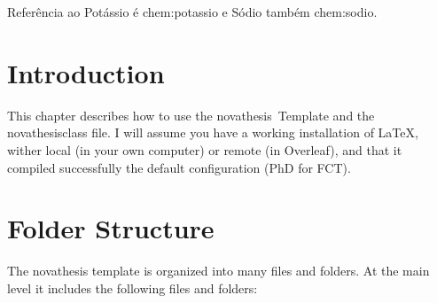 \glsresetall

\begin{center}
\end{center}

Referência ao Potássio é \gls{chem:potassio} e Sódio também \gls{chem:sodio}.

\section{Introduction}
\label{sec:introduction}

This chapter describes how to use the \gls{novathesis}\ Template and the \gls{novathesisclass} file.  I will assume you have a working installation of \LaTeX, wither local (in your own computer) or remote (in Overleaf), and that it compiled successfully the default configuration (PhD for \gls{FCT}).


\section{Folder Structure}
\label{sec:folder_structure}

The \gls{novathesis} template is organized into many files and folders. At the main level it includes the following files and folders:

